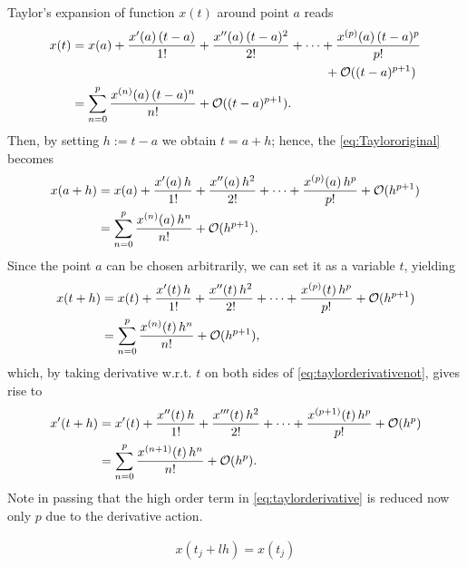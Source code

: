 \documentclass[12pt]{article}
\begin{document}
\newpage
\begin{observationboxed}
	\label{eq:Taylorniceform}
	Taylor's expansion of function $x(t)$ around point $a$ reads 
	\begin{align}
		\label{eq:Taylororiginal}
		x(t) 
		 & = x(a) 
		+ \frac{x'(a)\,(t-a)}{1!} + \frac{x''(a)\,(t-a)^2}{2!} + \dots + \frac{x^{(p)}(a)\,(t-a)^p}{p!}\notag           \\
		 & \quad\quad\quad\quad\quad\quad\quad\quad\quad\quad\quad\quad\quad\quad\quad\quad\quad\quad\quad\quad 
		+ \mathcal{O}((t-a)^{p+1})                                                                               \notag \\
		 & = \sum_{n=0}^{p} \frac{x^{(n)}(a)\,(t-a)^{n}}{n!} + \mathcal{O}((t-a)^{p+1}).
	\end{align}
	Then, by setting $h:= t-a$ we obtain $t=a+h$; hence, the \eqref{eq:Taylororiginal} becomes
	\begin{align}
		\label{eq:taylorderivativeno}
		x(a+h) 
		 & = x(a) 
		+ \frac{x'(a)\,h}{1!} + \frac{x''(a)\,h^2}{2!} + \dots + \frac{x^{(p)}(a)\,h^p}{p!}
		+ \mathcal{O}(h^{p+1})                                                 \notag \\
		 & = \sum_{n=0}^{p} \frac{x^{(n)}(a)\,h^{n}}{n!} + \mathcal{O}(h^{p+1}).
	\end{align}
	Since the point $a$ can be chosen arbitrarily, we can set it as a variable $t$, yielding
	\begin{align}
		\label{eq:taylorderivativenot}
		x(t+h) 
		 & = x(t) 
		+ \frac{x'(t)\,h}{1!} + \frac{x''(t)\,h^2}{2!} + \dots + \frac{x^{(p)}(t)\,h^p}{p!}
		+ \mathcal{O}(h^{p+1})                                                 \notag \\
		 & = \sum_{n=0}^{p} \frac{x^{(n)}(t)\,h^{n}}{n!} + \mathcal{O}(h^{p+1}),
	\end{align}
	which, by taking derivative w.r.t. $t$ on both sides of \eqref{eq:taylorderivativenot}, gives rise to
	\begin{align}
		\label{eq:taylorderivative}
		x'(t+h) 
		 & = x'(t) 
		+ \frac{x''(t)\,h}{1!} + \frac{x'''(t)\,h^2}{2!} + \dots + \frac{x^{(p+1)}(t)\,h^p}{p!}
		+ \mathcal{O}(h^{p})                                                 \notag \\
		 & = \sum_{n=0}^{p} \frac{x^{(n+1)}(t)\,h^{n}}{n!} + \mathcal{O}(h^{p}).
	\end{align}
	Note in passing that the high order term in \eqref{eq:taylorderivative} is reduced now only $p$
	due to the derivative action.
\end{observationboxed}
\begin{align}
	x(t_j+lh) = x(t_j)
\end{align}
\end{document}
